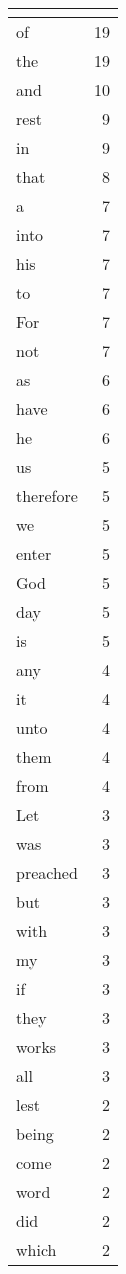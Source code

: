 \begin{center}
\begin{longtable}{l|r}
\hline \multicolumn{2}{c}{{ }} \\ \hline
\endfoot 
of & 19\\ \hline 
the & 19\\ \hline 
and & 10\\ \hline 
rest & 9\\ \hline 
in & 9\\ \hline 
that & 8\\ \hline 
a & 7\\ \hline 
into & 7\\ \hline 
his & 7\\ \hline 
to & 7\\ \hline 
For & 7\\ \hline 
not & 7\\ \hline 
as & 6\\ \hline 
have & 6\\ \hline 
he & 6\\ \hline 
us & 5\\ \hline 
therefore & 5\\ \hline 
we & 5\\ \hline 
enter & 5\\ \hline 
God & 5\\ \hline 
day & 5\\ \hline 
is & 5\\ \hline 
any & 4\\ \hline 
it & 4\\ \hline 
unto & 4\\ \hline 
them & 4\\ \hline 
from & 4\\ \hline 
Let & 3\\ \hline 
was & 3\\ \hline 
preached & 3\\ \hline 
but & 3\\ \hline 
with & 3\\ \hline 
my & 3\\ \hline 
if & 3\\ \hline 
they & 3\\ \hline 
works & 3\\ \hline 
all & 3\\ \hline 
lest & 2\\ \hline 
being & 2\\ \hline 
come & 2\\ \hline 
word & 2\\ \hline 
did & 2\\ \hline 
which & 2\\ \hline 

\end{longtable}
\end{center}
